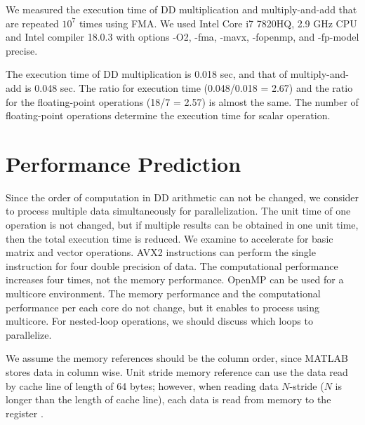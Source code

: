 \documentclass{IOS-Book-Article}
\begin{document}
We measured the execution time of DD multiplication and multiply-and-add that are repeated $10^7$ times using FMA.
We used Intel Core i7 7820HQ, 2.9 GHz CPU and Intel compiler 18.0.3 with options -O2, -fma, -mavx, -fopenmp, and -fp-model precise. 

The execution time of DD multiplication is 0.018 sec, and that of multiply-and-add is 0.048 sec. The ratio for execution time (0.048/0.018 = 2.67) and the ratio for the floating-point operations (18/7 = 2.57) is almost the same. The number of floating-point operations determine the execution time for scalar operation.

\section{Performance Prediction}
Since the order of computation in DD arithmetic can not be changed, we consider to process multiple data simultaneously for parallelization.
The unit time of one operation is not changed, but if multiple results can be obtained in one unit time, then the total execution time is reduced.
We examine to accelerate for basic matrix and vector operations.
AVX2 instructions \cite{SIMD} can perform the single instruction for four double precision of data. The computational performance increases four times, not the memory performance.
OpenMP \cite{omp} can be used for a multicore environment. The memory performance and the computational performance per each core do not change, but it enables to process using multicore. For nested-loop operations, we should discuss which loops to parallelize. 

We assume the memory references should be the column order, since MATLAB stores data in column wise. Unit stride memory reference can use the data read by cache line of length of 64 bytes; however, when reading data $N$-stride ($N$ is longer than the length of cache line), each data is read from memory to the register \cite{HPC}. 
\end{document}
